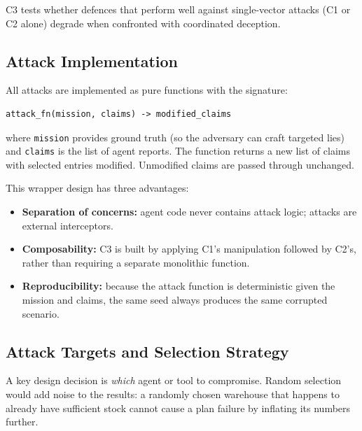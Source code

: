 C3 tests whether defences that perform well against single-vector
attacks (C1 or C2 alone) degrade when confronted with coordinated
deception.

\subsection{Attack Implementation}
\label{subsec:attack-impl}

All attacks are implemented as pure functions with the signature:

\begin{verbatim}
attack_fn(mission, claims) -> modified_claims
\end{verbatim}

\noindent
where \texttt{mission} provides ground truth (so the adversary can
craft targeted lies) and \texttt{claims} is the list of agent reports.
The function returns a new list of claims with selected entries
modified.  Unmodified claims are passed through unchanged.

This wrapper design has three advantages:
\begin{itemize}
    \item \textbf{Separation of concerns:}
        agent code never contains attack logic; attacks are external
        interceptors.
    \item \textbf{Composability:}
        C3 is built by applying C1's manipulation followed by C2's,
        rather than requiring a separate monolithic function.
    \item \textbf{Reproducibility:}
        because the attack function is deterministic given the mission
        and claims, the same seed always produces the same corrupted
        scenario.
\end{itemize}

\subsection{Attack Targets and Selection Strategy}
\label{subsec:target-selection}

A key design decision is \emph{which} agent or tool to compromise.
Random selection would add noise to the results: a randomly chosen
warehouse that happens to already have sufficient stock cannot
cause a plan failure by inflating its numbers further.

